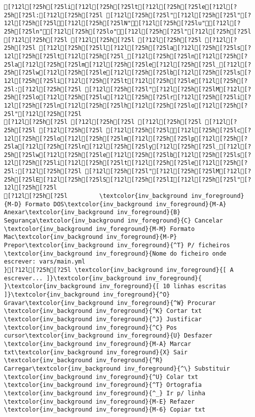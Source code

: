 \documentclass{scrartcl}
\begin{document}
\begin{Verbatim}
[?12l[?25h[?25li[?12l[?25h[?25lt[?12l[?25h[?25le[?12l[?25h[?25l:[?12l[?25h[?25l [?12l[?25h[?25l"[?12l[?25h[?25l"[?12l[?25h[?25l[?12l[?25h[?25lN"[?12l[?25h[?25lu"[?12l[?25h[?25ln"[?12l[?25h[?25lo"[?12l[?25h[?25l"[?12l[?25h[?25l
[?12l[?25h[?25l [?12l[?25h[?25l [?12l[?25h[?25l [?12l[?25h[?25l [?12l[?25h[?25ll[?12l[?25h[?25la[?12l[?25h[?25ls[?12l[?25h[?25lt[?12l[?25h[?25l_[?12l[?25h[?25ln[?12l[?25h[?25la[?12l[?25h[?25lm[?12l[?25h[?25le[?12l[?25h[?25l_[?12l[?25h[?25lw[?12l[?25h[?25le[?12l[?25h[?25lb[?12l[?25h[?25ls[?12l[?25h[?25li[?12l[?25h[?25lt[?12l[?25h[?25le[?12l[?25h[?25l:[?12l[?25h[?25l [?12l[?25h[?25l"[?12l[?25h[?25lM[?12l[?25h[?25lo[?12l[?25h[?25lu[?12l[?25h[?25lr[?12l[?25h[?25li[?12l[?25h[?25ln[?12l[?25h[?25lh[?12l[?25h[?25lo[?12l[?25h[?25l"[?12l[?25h[?25l
[?12l[?25h[?25l [?12l[?25h[?25l [?12l[?25h[?25l [?12l[?25h[?25l [?12l[?25h[?25l [?12l[?25h[?25l[?12l[?25h[?25lc[?12l[?25h[?25lo[?12l[?25h[?25lm[?12l[?25h[?25lp[?12l[?25h[?25la[?12l[?25h[?25ln[?12l[?25h[?25ly[?12l[?25h[?25l_[?12l[?25h[?25lw[?12l[?25h[?25le[?12l[?25h[?25lb[?12l[?25h[?25ls[?12l[?25h[?25li[?12l[?25h[?25lt[?12l[?25h[?25le[?12l[?25h[?25l:[?12l[?25h[?25l [?12l[?25h[?25l"[?12l[?25h[?25lM[?12l[?25h[?25lE[?12l[?25h[?25lS[?12l[?25h[?25lI[?12l[?25h[?25l"[?12l[?25h[?25l
[?12l[?25h[?25l         \textcolor{inv_background inv_foreground}{M-D} Formato DOS\textcolor{inv_background inv_foreground}{M-A} Anexar\textcolor{inv_background inv_foreground}{B} Segurança\textcolor{inv_background inv_foreground}{C} Cancelar           \textcolor{inv_background inv_foreground}{M-M} Formato Mac\textcolor{inv_background inv_foreground}{M-P} Prepor\textcolor{inv_background inv_foreground}{^T} P/ ficheiros
\textcolor{inv_background inv_foreground}{Nome do ficheiro onde escrever: vars/main.yml                                                                                             }[?12l[?25h[?25l \textcolor{inv_background inv_foreground}{[ A escrever... ]}\textcolor{inv_background inv_foreground}{          }\textcolor{inv_background inv_foreground}{[ 10 linhas escritas ]}\textcolor{inv_background inv_foreground}{^O} Gravar\textcolor{inv_background inv_foreground}{^W} Procurar      \textcolor{inv_background inv_foreground}{^K} Cortar txt    \textcolor{inv_background inv_foreground}{^J} Justificar    \textcolor{inv_background inv_foreground}{^C} Pos cursor\textcolor{inv_background inv_foreground}{U} Desfazer     \textcolor{inv_background inv_foreground}{M-A} Marcar txt\textcolor{inv_background inv_foreground}{X} Sair    \textcolor{inv_background inv_foreground}{^R} Carregar\textcolor{inv_background inv_foreground}{^\} Substituir    \textcolor{inv_background inv_foreground}{^U} Colar txt     \textcolor{inv_background inv_foreground}{^T} Ortografia    \textcolor{inv_background inv_foreground}{^_} Ir p/ linha   \textcolor{inv_background inv_foreground}{M-E} Refazer      \textcolor{inv_background inv_foreground}{M-6} Copiar txt

\end{Verbatim}
\end{document}
